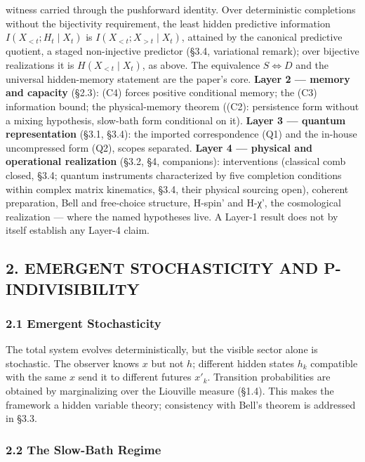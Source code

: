 \documentclass[
]{article}
\begin{document}
witness carried through the pushforward identity. Over deterministic
completions without the bijectivity requirement, the least hidden
predictive information \(I(X_{<t}; H_t \mid X_t)\) is
\(I(X_{<t}; X_{>t} \mid X_t)\), attained by the canonical predictive
quotient, a staged non-injective predictor (§3.4, variational remark);
over bijective realizations it is \(H(X_{<t} \mid X_t)\), as above. The
equivalence \(S \iff D\) and the universal hidden-memory statement are
the paper's core. \textbf{Layer 2 --- memory and capacity} (§2.3): (C4)
forces positive conditional memory; the (C3) information bound; the
physical-memory theorem ((C2): persistence form without a mixing
hypothesis, slow-bath form conditional on it). \textbf{Layer 3 ---
quantum representation} (§3.1, §3.4): the imported correspondence (Q1)
and the in-house uncompressed form (Q2), scopes separated. \textbf{Layer
4 --- physical and operational realization} (§3.2, §4, companions):
interventions (classical comb closed, §3.4; quantum instruments
characterized by five completion conditions within complex matrix
kinematics, §3.4, their physical sourcing open), coherent preparation,
Bell and free-choice structure, H-spin' and H-χ', the cosmological
realization --- where the named hypotheses live. A Layer-1 result does
not by itself establish any Layer-4 claim.

\hypertarget{emergent-stochasticity-and-p-indivisibility}{%
\subsection{2. EMERGENT STOCHASTICITY AND
P-INDIVISIBILITY}\label{emergent-stochasticity-and-p-indivisibility}}

\hypertarget{emergent-stochasticity}{%
\subsubsection{2.1 Emergent
Stochasticity}\label{emergent-stochasticity}}

The total system evolves deterministically, but the visible sector alone
is stochastic. The observer knows \(x\) but not \(h\); different hidden
states \(h_k\) compatible with the same \(x\) send it to different
futures \(x'_k\). Transition probabilities are obtained by marginalizing
over the Liouville measure (§1.4). This makes the framework a hidden
variable theory; consistency with Bell's theorem is addressed in §3.3.

\hypertarget{the-slow-bath-regime}{%
\subsubsection{2.2 The Slow-Bath Regime}\label{the-slow-bath-regime}}
\end{document}
